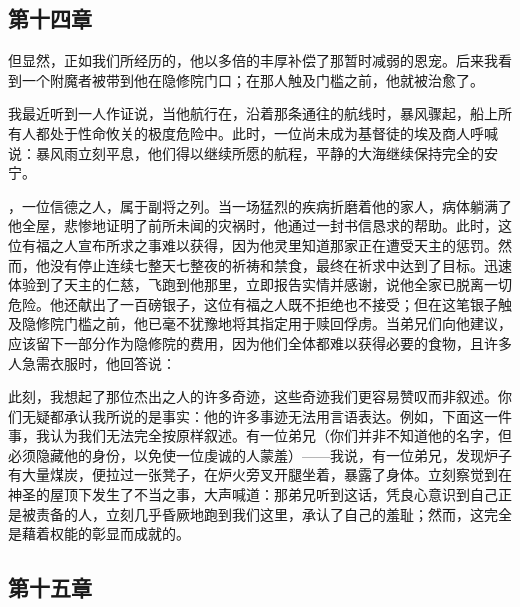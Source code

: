 
\subsection{第十四章}

但显然，正如我们所经历的，他以多倍的丰厚补偿了那暂时减弱的恩宠。后来我看到一个附魔者被带到他在隐修院门口；在那人触及门槛之前，他就被治愈了。\par

我最近听到一人作证说，当他航行在，沿着那条通往的航线时，暴风骤起，船上所有人都处于性命攸关的极度危险中。此时，一位尚未成为基督徒的埃及商人呼喊说：暴风雨立刻平息，他们得以继续所愿的航程，平静的大海继续保持完全的安宁。\par

，一位信德之人，属于副将之列。当一场猛烈的疾病折磨着他的家人，病体躺满了他全屋，悲惨地证明了前所未闻的灾祸时，他通过一封书信恳求的帮助。此时，这位有福之人宣布所求之事难以获得，因为他灵里知道那家正在遭受天主的惩罚。然而，他没有停止连续七整天七整夜的祈祷和禁食，最终在祈求中达到了目标。迅速体验到了天主的仁慈，飞跑到他那里，立即报告实情并感谢，说他全家已脱离一切危险。他还献出了一百磅银子，这位有福之人既不拒绝也不接受；但在这笔银子触及隐修院门槛之前，他已毫不犹豫地将其指定用于赎回俘虏。当弟兄们向他建议，应该留下一部分作为隐修院的费用，因为他们全体都难以获得必要的食物，且许多人急需衣服时，他回答说：\par

此刻，我想起了那位杰出之人的许多奇迹，这些奇迹我们更容易赞叹而非叙述。你们无疑都承认我所说的是事实：他的许多事迹无法用言语表达。例如，下面这一件事，我认为我们无法完全按原样叙述。有一位弟兄（你们并非不知道他的名字，但必须隐藏他的身份，以免使一位虔诚的人蒙羞）——我说，有一位弟兄，发现炉子有大量煤炭，便拉过一张凳子，在炉火旁叉开腿坐着，暴露了身体。立刻察觉到在神圣的屋顶下发生了不当之事，大声喊道：那弟兄听到这话，凭良心意识到自己正是被责备的人，立刻几乎昏厥地跑到我们这里，承认了自己的羞耻；然而，这完全是藉着权能的彰显而成就的。\par


\subsection{第十五章}

